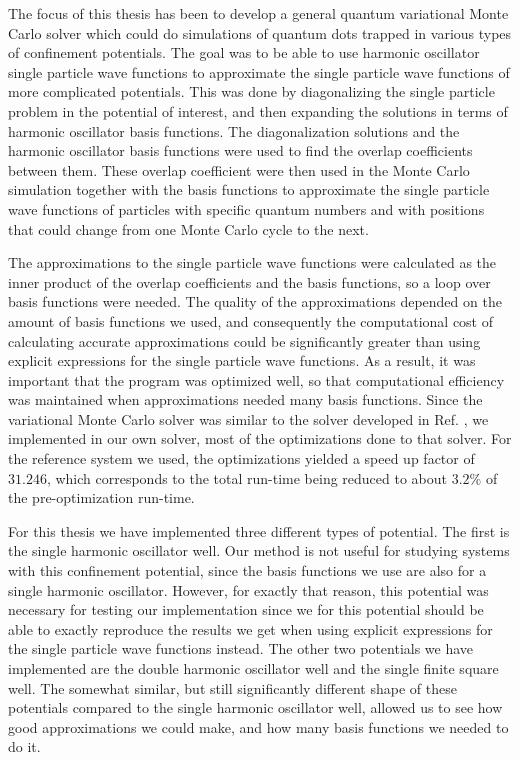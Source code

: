 \documentclass[../main.tex]{subfiles}
\begin{document}
The focus of this thesis has been to develop a general quantum variational Monte Carlo solver which could do simulations of quantum dots trapped in various types of confinement potentials. The goal was to be able to use harmonic oscillator single particle wave functions to approximate the single particle wave functions of more complicated potentials. This was done by diagonalizing the single particle problem in the potential of interest, and then expanding the solutions in terms of harmonic oscillator basis functions. The diagonalization solutions and the harmonic oscillator basis functions were used to find the overlap coefficients between them. These overlap coefficient were then used in the Monte Carlo simulation together with the basis functions to approximate the single particle wave functions of particles with specific quantum numbers and with positions that could change from one Monte Carlo cycle to the next. 

The approximations to the single particle wave functions were calculated as the inner product of the overlap coefficients and the basis functions, so a loop over basis functions were needed. The quality of the approximations depended on the amount of basis functions we used, and consequently the computational cost of calculating accurate approximations could be significantly greater than using explicit expressions for the single particle wave functions. As a result, it was important that the program was optimized well, so that computational efficiency was maintained when approximations needed many basis functions. Since the variational Monte Carlo solver was similar to the solver developed in Ref. \cite{Jorgen}, we implemented in our own solver, most of the optimizations done to that solver. For the reference system we used, the optimizations yielded a speed up factor of $31.246$, which corresponds to the total run-time being reduced to about $3.2\%$ of the pre-optimization run-time.

For this thesis we have implemented three different types of potential. The first is the single harmonic oscillator well. Our method is not useful for studying systems with this confinement potential, since the basis functions we use are also for a single harmonic oscillator. However, for exactly that reason, this potential was necessary for testing our implementation since we for this potential should be able to exactly reproduce the results we get when using explicit expressions for the single particle wave functions instead. The other two potentials we have implemented are the double harmonic oscillator well and the single finite square well. The somewhat similar, but still significantly different shape of these potentials compared to the single harmonic oscillator well, allowed us to see how good approximations we could make, and how many basis functions we needed to do it.
\end{document}
